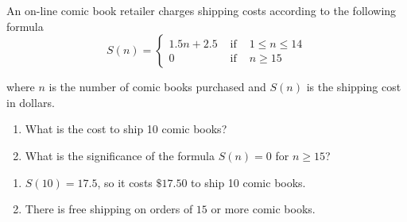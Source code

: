 {\label{piecewiseshipping} An on-line comic book retailer charges shipping costs according to the following formula \[{\displaystyle S(n) = \left\{ \begin{array}{rcl}  1.5 n + 2.5 & \mbox{ if } & 1 \leq n \leq 14  \\
                                                            0  & \mbox{ if } & n \geq 15
                                     \end{array} \right. }\]
                                     
where $n$ is the number of  comic books purchased and $S(n)$ is the shipping cost in dollars.
                                     
\begin{enumerate}

\item  What is the cost to ship 10 comic books?  %

\item  What is the significance of the formula $S(n) = 0$ for $n \geq 15$?   %
 
\end{enumerate}
}
{ \begin{enumerate}

\item  $S(10) = 17.5$, so it costs $\$ 17.50$ to ship 10 comic books.

\item  There is free shipping on orders of $15$ or more comic books. 
 
\end{enumerate}}